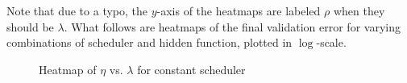 \documentclass{article}
\theoremstyle{definition}
\begin{document}
Note that due to a typo, the $y$-axis of the heatmaps are labeled $\rho$ when they should be $\lambda$. What follows are heatmaps of the final validation error for varying combinations of scheduler and hidden function, plotted in $\log$-scale.
\begin{figure}[H]%
    \centering
    \qquad
    \caption{Heatmap of $\eta$ vs. $\lambda$ for constant scheduler}%
    \label{fig:FrankeConstant}%
\end{figure}
\end{document}
